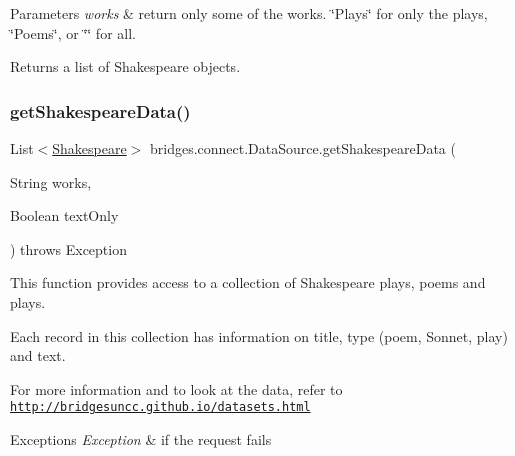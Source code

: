 \begin{DoxyParams}{Parameters}
{\em works} & return only some of the works. \char`\"{}\+Plays\char`\"{} for only the plays, \char`\"{}\+Poems\char`\"{}, or \char`\"{}\char`\"{} for all.\\
\hline
\end{DoxyParams}
\begin{DoxyReturn}{Returns}
a list of Shakespeare objects. 
\end{DoxyReturn}
\mbox{\label{classbridges_1_1connect_1_1_data_source_abf8e8f8ff3eb14fa6c6b5ce6b48dbadb}} 
\subsubsection{\texorpdfstring{get\+Shakespeare\+Data()}{getShakespeareData()}\hspace{0.1cm}{\footnotesize\ttfamily [3/3]}}
{\footnotesize\ttfamily List$<$\hyperlink{classbridges_1_1data__src__dependent_1_1_shakespeare}{Shakespeare}$>$ bridges.\+connect.\+Data\+Source.\+get\+Shakespeare\+Data (\begin{DoxyParamCaption}\item[{String}]{works,  }\item[{Boolean}]{text\+Only }\end{DoxyParamCaption}) throws Exception}



This function provides access to a collection of Shakespeare plays, poems and plays. 

Each record in this collection has information on title, type (poem, Sonnet, play) and text.

For more information and to look at the data, refer to \href{http://bridgesuncc.github.io/datasets.html}{\tt http\+://bridgesuncc.\+github.\+io/datasets.\+html}


\begin{DoxyExceptions}{Exceptions}
{\em Exception} & if the request fails\\
\hline
\end{DoxyExceptions}

